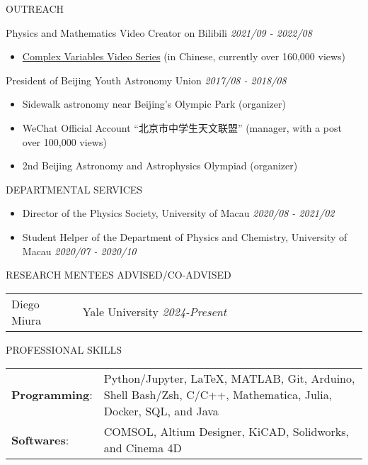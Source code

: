 \documentclass[11pt]{article} %
\begin{document}
\begin{section}{OUTREACH}

Physics and Mathematics Video Creator on Bilibili \hfill \textit{2021/09 - 2022/08}
\begin{itemize}[leftmargin=1.5em]
    \item \href{https://www.bilibili.com/video/BV1th411W7xu/}{Complex Variables Video Series} (in Chinese, currently over 160,000 views) 
\end{itemize}

President of Beijing Youth Astronomy Union \hfill \textit{2017/08 - 2018/08} 
\begin{itemize}[leftmargin=1.5em]
    \item Sidewalk astronomy near Beijing's Olympic Park (organizer)
    \item WeChat Official Account ``北京市中学生天文联盟'' (manager, with a post over 100,000 views)
    \item 2nd Beijing Astronomy and Astrophysics Olympiad (organizer) 
\end{itemize}

\end{section}

\begin{section}{DEPARTMENTAL SERVICES}
    
\begin{itemize}[leftmargin=1.5em]
    \item Director of the Physics Society, University of Macau \hfill \textit{2020/08 - 2021/02}
    \item Student Helper of the Department of Physics and Chemistry, University of Macau \hfill \textit{2020/07 - 2020/10} 
\end{itemize}

\end{section}

\begin{section}{RESEARCH MENTEES ADVISED/CO-ADVISED}

\begin{tabular}{@{}p{0.2\linewidth}@{}p{0.8\linewidth}@{}}
    Diego Miura & Yale University \hfill \textit{2024-Present} \\
\end{tabular}

\end{section}

\begin{section}{PROFESSIONAL SKILLS}

\begin{tabular}{@{}p{0.2\linewidth}@{}p{0.8\linewidth}@{}}
    \textbf{Programming}: & Python/Jupyter, \LaTeX, MATLAB, Git, Arduino, Shell Bash/Zsh, C/C++, Mathematica, Julia, Docker, SQL, and Java \\
    \textbf{Softwares}: & COMSOL, Altium Designer, KiCAD, Solidworks, and Cinema 4D \\
\end{tabular}
    
\end{section} 
\end{document}
